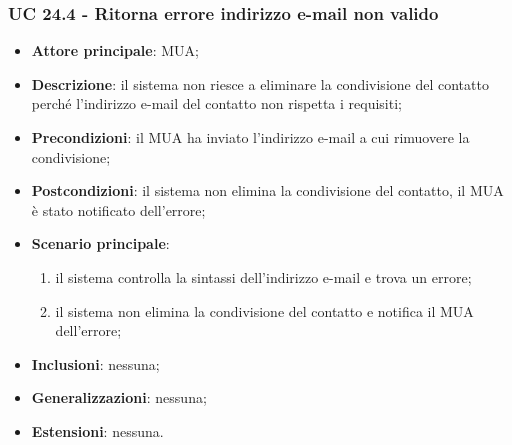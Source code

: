     \subsubsection{UC 24.4 - Ritorna errore indirizzo e-mail non valido} \label{sec:UC24.4}
    \begin{itemize}
        \item \textbf{Attore principale}: MUA;
        \item \textbf{Descrizione}: il sistema non riesce a eliminare la condivisione del contatto perché l'indirizzo e-mail del contatto non rispetta i requisiti;
        \item \textbf{Precondizioni}: il MUA ha inviato l'indirizzo e-mail a cui rimuovere la condivisione;
        \item \textbf{Postcondizioni}: il sistema non elimina la condivisione del contatto, il MUA è stato notificato dell'errore;
        \item \textbf{Scenario principale}:
            \begin{enumerate}
                \item il sistema controlla la sintassi dell'indirizzo e-mail e trova un errore;
                \item il sistema non elimina la condivisione del contatto e notifica il MUA dell'errore;
            \end{enumerate}
        \item \textbf{Inclusioni}: nessuna;
        \item \textbf{Generalizzazioni}: nessuna;
        \item \textbf{Estensioni}: nessuna.
    \end{itemize}
